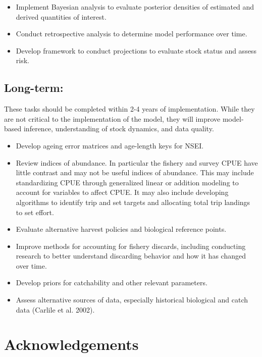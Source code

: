 \documentclass[]{article}
\providecommand{\tightlist}{%
  \setlength{\itemsep}{0pt}\setlength{\parskip}{0pt}}
\begin{document}
\begin{itemize}
\tightlist
\item
  Implement Bayesian analysis to evaluate posterior densities of
  estimated and derived quantities of interest.
\item
  Conduct retrospective analysis to determine model performance over
  time.
\item
  Develop framework to conduct projections to evaluate stock status and
  assess risk.
\end{itemize}

\subsection{Long-term:}\label{long-term}

These tasks should be completed within 2-4 years of implementation.
While they are not critical to the implementation of the model, they
will improve model-based inference, understanding of stock dynamics, and
data quality.

\begin{itemize}
\tightlist
\item
  Develop ageing error matrices and age-length keys for NSEI.
\item
  Review indices of abundance. In particular the fishery and survey CPUE
  have little contrast and may not be useful indices of abundance. This
  may include standardizing CPUE through generalized linear or addition
  modeling to account for variables to affect CPUE. It may also include
  developing algorithms to identify trip and set targets and allocating
  total trip landings to set effort.
\item
  Evaluate alternative harvest policies and biological reference points.
\item
  Improve methods for accounting for fishery discards, including
  conducting research to better understand discarding behavior and how
  it has changed over time.
\item
  Develop priors for catchability and other relevant parameters.
\item
  Assess alternative sources of data, especially historical biological
  and catch data (Carlile et al. 2002).
\end{itemize}

\section{Acknowledgements}\label{acknowledgements}
\end{document}
